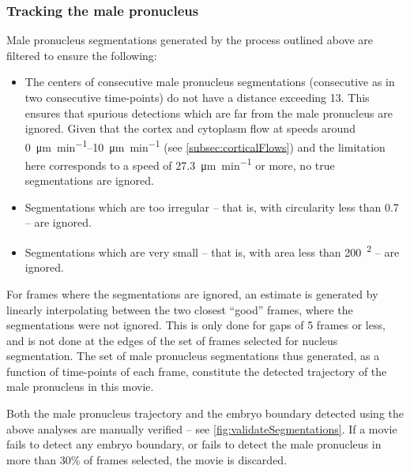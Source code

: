 \subsubsection{Tracking the male pronucleus}\label{subsubsec:nucleusTrack}
Male pronucleus segmentations generated by the process outlined above are filtered to ensure the following:
\begin{itemize}
    \item The centers of consecutive male pronucleus segmentations (consecutive as in two consecutive time-points) do not have a distance exceeding \SI{13}{\pixels}. This ensures that spurious detections which are far from the male pronucleus are ignored. Given that the cortex and cytoplasm flow at speeds around \SIrange{0}{10}{\micro\meter\per\minute} (see \autoref{subsec:corticalFlows}) and the limitation here corresponds to a speed of \SI{27.3}{\micro\meter\per\minute} or more, no true segmentations are ignored.
    \item Segmentations which are too irregular -- that is, with circularity less than \num{0.7} --  are ignored.
    \item Segmentations which are very small -- that is, with area less than \SI{200}{\pixels^2} --  are ignored.
\end{itemize}
For frames where the segmentations are ignored, an estimate is generated by linearly interpolating between the two closest \enquote{good} frames, where the segmentations were not ignored. This is only done for gaps of \num{5} frames or less, and is not done at the edges of the set of frames selected for nucleus segmentation. The set of male pronucleus segmentations thus generated, as a function of time-points of each frame, constitute the detected trajectory of the male pronucleus in this movie.  

Both the male pronucleus trajectory and the embryo boundary detected using the above analyses are manually verified -- see \autoref{fig:validateSegmentations}. If a movie fails to detect any embryo boundary, or fails to detect the male pronucleus in more than \num{30}\% of frames selected, the movie is discarded.

